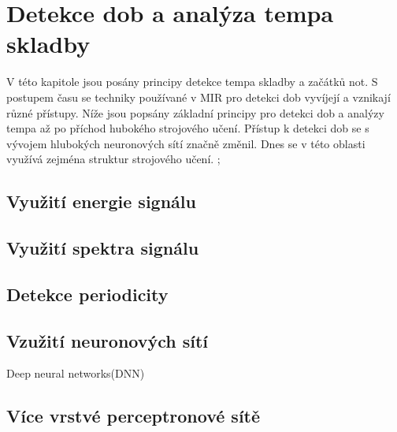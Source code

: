 
\section{Detekce dob a analýza tempa skladby} \label{sec:Detekce_tempa}
V této kapitole jsou posány principy detekce tempa skladby a začátků not.
S postupem času se techniky používané v \acs*{MIR} pro detekci dob vyvíjejí a vznikají různé přístupy.
Níže jsou popsány základní principy pro detekci dob a analýzy tempa až po příchod hubokého strojového učení.
Přístup k detekci dob se s vývojem hlubokých neuronových sítí značně změnil. 
Dnes se v této oblasti využívá zejména struktur strojového učení.
\cite{tempobeatdownbeat:book} \cite{fundamental_of_music_processing};


  \subsection{Využití energie signálu}

  \subsection{Využití spektra signálu}
  
  \subsection{Detekce periodicity}

  \subsection{Vzužití neuronových sítí}
    Deep neural networks(DNN)
  
  \subsection{Více vrstvé perceptronové sítě}

